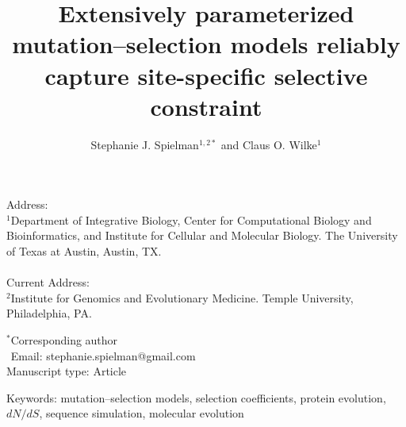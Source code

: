 \documentclass[11pt]{article}
\begin{document}
\title{\textbf{Extensively parameterized mutation--selection models reliably capture site-specific selective constraint}}
\author{Stephanie J. Spielman$^{1,2*}$ and Claus O. Wilke$^{1}$}
\date{}

\maketitle

\noindent
Address:\\
$^1$Department of Integrative Biology, Center for Computational Biology and Bioinformatics, and Institute for Cellular and Molecular Biology. The University of Texas at Austin, Austin, TX.\\\\
Current Address:\\
$^2$Institute for Genomics and Evolutionary Medicine. Temple University, Philadelphia, PA.

\bigskip
\noindent
$^*$Corresponding author\\
$\phantom{^*}$Email: stephanie.spielman@gmail.com\\

\bigskip
\noindent
Manuscript type: Article

\bigskip
\noindent Keywords: mutation--selection models, selection coefficients, protein evolution, $dN/dS$, sequence simulation, molecular evolution


\newpage
\end{document}
